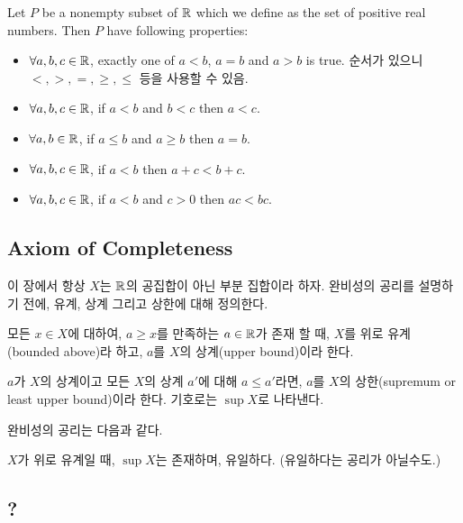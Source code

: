\begin{property}
  Let $P$ be a nonempty subset of $\mathbb{R}$ which we define as the set of positive
  real numbers. Then $P$ have following properties:
  \begin{itemize}
    \item $\forall a, b, c \in \mathbb{R}$, exactly one of $a < b$, $a = b$ and $a > b$
          is true. 순서가 있으니 $<, >, =, \ge, \le$ 등을 사용할 수 있음.
    \item $\forall a, b, c \in \mathbb{R}$, if $a < b$ and $b < c$ then $a < c$.
    \item $\forall a, b \in \mathbb{R}$, if $a \le b$ and $a \ge b$ then $a = b$.
    \item $\forall a, b, c \in \mathbb{R}$, if $a < b$ then $a + c < b + c$.
    \item $\forall a, b, c \in \mathbb{R}$, if $a < b$ and $c > 0$ then $ac < bc$.
  \end{itemize}
\end{property}

\subsection*{Axiom of Completeness}
이 장에서 항상 $X$는 $\mathbb{R}$의 공집합이 아닌 부분 집합이라 하자. 완비성의 공리를 설명하기 전에,
유계, 상계 그리고 상한에 대해 정의한다.

\begin{definition}
  모든 $x \in X$에 대하여, $a \geq x$를 만족하는 $a \in \mathbb{R}$가 존재 할 때, $X$를
  위로 유계(bounded above)라 하고, $a$를 $X$의 상계(upper bound)이라 한다.
  \label{def:bound}
\end{definition}

\begin{definition}
  $a$가 $X$의 상계이고 모든 $X$의 상계 $a'$에 대해 $a \leq a'$라면,
  $a$를 $X$의 상한(supremum or least upper bound)이라 한다.
  기호로는 $\sup X$로 나타낸다.
  \label{def:supremum}
\end{definition}


완비성의 공리는 다음과 같다.

\begin{axiom}[Completeness]
  $X$가 위로 유계일 때, $\sup X$는 존재하며, 유일하다. (유일하다는 공리가 아닐수도.)
  \label{pro:bound2}
\end{axiom}

\subsection*{?}

